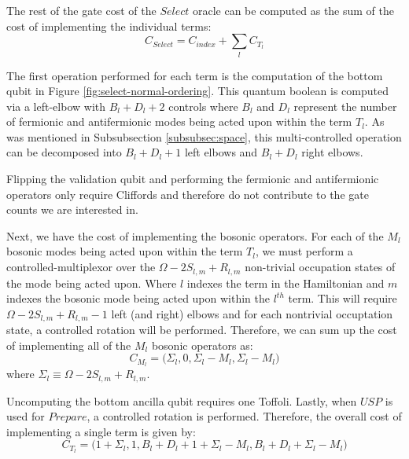 The rest of the gate cost of the $\textit{Select}$ oracle can be computed as the sum of the cost of implementing the individual terms:
\begin{equation}
    C_{\textit{Select}} = C_{\textit{index}} + \sum_{l} C_{T_l}
\end{equation}

The first operation performed for each term is the computation of the bottom qubit in Figure \ref{fig:select-normal-ordering}.
This quantum boolean is computed via a left-elbow with $B_l + D_l + 2$ controls where $B_l$ and $D_l$ represent the number of fermionic and antifermionic modes being acted upon within the term $T_l$.
As was mentioned in Subsubsection \ref{subsubsec:space}, this multi-controlled operation can be decomposed into $B_l + D_l + 1$ left elbows and $B_l + D_l$ right elbows.

Flipping the validation qubit and performing the fermionic and antifermionic operators only require Cliffords and therefore do not contribute to the gate counts we are interested in.

Next, we have the cost of implementing the bosonic operators.
For each of the $M_l$ bosonic modes being acted upon within the term $T_l$, we must perform a controlled-multiplexor over the $\Omega - 2S_{l, m} + R_{l, m}$ non-trivial occupation states of the mode being acted upon.
Where $l$ indexes the term in the Hamiltonian and $m$ indexes the bosonic mode being acted upon within the $l^{th}$ term.
This will require $\Omega - 2S_{l, m} + R_{l, m} - 1$ left (and right) elbows and for each nontrivial occuptation state, a controlled rotation will be performed.
Therefore, we can sum up the cost of implementing all of the $M_l$ bosonic operators as: 
\begin{equation}
    C_{M_l} = \Big(\Sigma_l, 0, \Sigma_l - M_l, \Sigma_l - M_l \Big)
\end{equation}
where $\Sigma_{l} \equiv \Omega - 2S_{l, m} + R_{l, m}$.


Uncomputing the bottom ancilla qubit requires one Toffoli. 
Lastly, when $USP$ is used for $\textit{Prepare}$, a controlled rotation is performed.
Therefore, the overall cost of implementing a single term  is given by:
\begin{equation}
    C_{T_l} = \Big(1 + \Sigma_l, 1, B_l + D_l + 1 + \Sigma_l - M_l, B_l + D_l + \Sigma_l - M_l \Big)
\end{equation}

